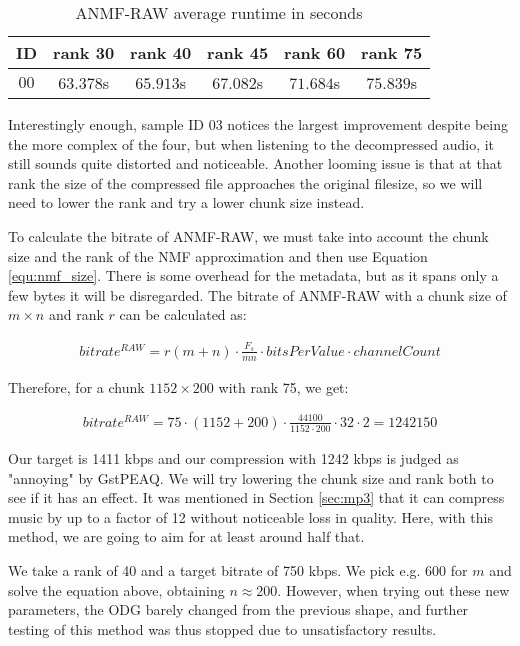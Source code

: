 \begin{table}[htbp]\caption{ANMF-RAW average runtime in seconds}
	\label{tab:anmf_raw_runtime}
	\centering
	\begin{tabular}{|c|c|c|c|c|c|}
		\hline
		ID & rank 30 & rank 40 & rank 45 & rank 60 & rank 75 \\ \hline
		$00$ & $63.378$s & $65.913$s & $67.082$s & $71.684$s & $75.839$s \\	
		\hline
	\end{tabular}
\end{table}

Interestingly enough, sample ID 03 notices the largest improvement despite being the more complex of the four, but when listening to the decompressed audio, it still sounds quite distorted and noticeable. Another looming issue is that at that rank the size of the compressed file approaches the original filesize, so we will need to lower the rank and try a lower chunk size instead.

To calculate the bitrate of ANMF-RAW, we must take into account the chunk size and the rank of the NMF approximation and then use Equation \ref{equ:nmf_size}. There is some overhead for the metadata, but as it spans only a few bytes it will be disregarded. The bitrate of ANMF-RAW with a chunk size of $m \times n$ and rank $r$ can be calculated as:

\begin{align}
bitrate^{RAW} = r(m+n) \cdot \frac{F_s}{mn} \cdot bitsPerValue \cdot channelCount
\end{align}

Therefore, for a chunk $1152 \times 200$ with rank 75, we get:

\begin{align}
bitrate^{RAW} = 75 \cdot (1152 + 200) \cdot \frac{44100}{1152 \cdot 200} \cdot 32 \cdot 2 = 1242150
\end{align}

Our target is 1411 kbps and our compression with 1242 kbps is judged as "annoying" by GstPEAQ. We will try lowering the chunk size and rank both to see if it has an effect. It was mentioned in Section \ref{sec:mp3} that it can compress music by up to a factor of 12 without noticeable loss in quality. Here, with this method, we are going to aim for at least around half that.

We take a rank of 40 and a target bitrate of 750 kbps. We pick e.g. $600$ for $m$ and solve the equation above, obtaining $n \approx 200$. However, when trying out these new parameters, the ODG barely changed from the previous shape, and further testing of this method was thus stopped due to unsatisfactory results.

